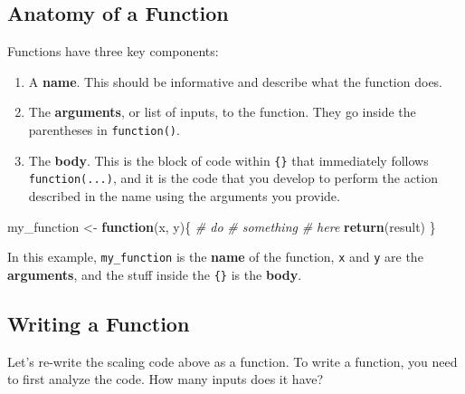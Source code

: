 \documentclass[]{book}
\newenvironment{Shaded}{\begin{snugshade}}{\end{snugshade}}
\newcommand{\KeywordTok}[1]{\textcolor[rgb]{0.13,0.29,0.53}{\textbf{#1}}}
\newcommand{\StringTok}[1]{\textcolor[rgb]{0.31,0.60,0.02}{#1}}
\newcommand{\CommentTok}[1]{\textcolor[rgb]{0.56,0.35,0.01}{\textit{#1}}}
\newcommand{\ControlFlowTok}[1]{\textcolor[rgb]{0.13,0.29,0.53}{\textbf{#1}}}
\newcommand{\NormalTok}[1]{#1}
\begin{document}
\subsection{Anatomy of a Function}\label{anatomy-of-a-function}

Functions have three key components:

\begin{enumerate}
\def\labelenumi{\arabic{enumi}.}
\item
  A \textbf{name}. This should be informative and describe what the
  function does.
\item
  The \textbf{arguments}, or list of inputs, to the function. They go
  inside the parentheses in \texttt{function()}.
\item
  The \textbf{body}. This is the block of code within \texttt{\{\}} that
  immediately follows \texttt{function(...)}, and it is the code that
  you develop to perform the action described in the name using the
  arguments you provide.
\end{enumerate}

\begin{Shaded}
\begin{Highlighting}[]
\NormalTok{my_function <-}\StringTok{ }\ControlFlowTok{function}\NormalTok{(x, y)\{}
  \CommentTok{# do}
  \CommentTok{# something}
  \CommentTok{# here}
  \KeywordTok{return}\NormalTok{(result)}
\NormalTok{\}}
\end{Highlighting}
\end{Shaded}

In this example, \texttt{my\_function} is the \textbf{name} of the
function, \texttt{x} and \texttt{y} are the \textbf{arguments}, and the
stuff inside the \texttt{\{\}} is the \textbf{body}.

\subsection{Writing a Function}\label{writing-a-function}

Let's re-write the scaling code above as a function. To write a
function, you need to first analyze the code. How many inputs does it
have?
\end{document}
